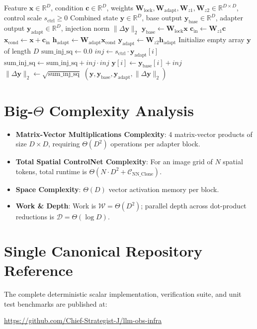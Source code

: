 \documentclass[11pt,a4paper]{article}
\theoremstyle{definition}
\begin{document}
\begin{algorithm}[H]
\caption{ControlNet Locked-Cloned Branch Forward Evaluation}
\begin{algorithmic}[1]
\Require Feature $\mathbf{x} \in \mathbb{R}^D$, condition $\mathbf{c} \in \mathbb{R}^D$, weights $\mathbf{W}_{\text{lock}}, \mathbf{W}_{\text{adapt}}, \mathbf{W}_{z1}, \mathbf{W}_{z2} \in \mathbb{R}^{D \times D}$, control scale $s_{\text{ctrl}} \ge 0$
\Ensure Combined state $\mathbf{y} \in \mathbb{R}^D$, base output $\mathbf{y}_{\text{base}} \in \mathbb{R}^D$, adapter output $\mathbf{y}_{\text{adapt}} \in \mathbb{R}^D$, injection norm $\|\Delta \mathbf{y}\|_2$
\State $\mathbf{y}_{\text{base}} \gets \mathbf{W}_{\text{lock}} \mathbf{x}$
\State $\mathbf{c}_{\text{in}} \gets \mathbf{W}_{z1} \mathbf{c}$
\State $\mathbf{x}_{\text{cond}} \gets \mathbf{x} + \mathbf{c}_{\text{in}}$
\State $\mathbf{h}_{\text{adapt}} \gets \mathbf{W}_{\text{adapt}} \mathbf{x}_{\text{cond}}$
\State $\mathbf{y}_{\text{adapt}} \gets \mathbf{W}_{z2} \mathbf{h}_{\text{adapt}}$
\State Initialize empty array $\mathbf{y}$ of length $D$
\State $\text{sum\_inj\_sq} \gets 0.0$
    \State $inj \gets s_{\text{ctrl}} \cdot \mathbf{y}_{\text{adapt}}[i]$
    \State $\text{sum\_inj\_sq} \gets \text{sum\_inj\_sq} + inj \cdot inj$
    \State $\mathbf{y}[i] \gets \mathbf{y}_{\text{base}}[i] + inj$
\EndFor
\State $\|\Delta \mathbf{y}\|_2 \gets \sqrt{\text{sum\_inj\_sq}}$
\State \Return $(\mathbf{y}, \mathbf{y}_{\text{base}}, \mathbf{y}_{\text{adapt}}, \|\Delta \mathbf{y}\|_2)$
\end{algorithmic}
\end{algorithm}

\section{Big-$\Theta$ Complexity Analysis}

\begin{itemize}
    \item \textbf{Matrix-Vector Multiplications Complexity}: 4 matrix-vector products of size $D \times D$, requiring $\Theta(D^2)$ operations per adapter block.
    \item \textbf{Total Spatial ControlNet Complexity}: For an image grid of $N$ spatial tokens, total runtime is $\Theta(N \cdot D^2 + \mathcal{C}_{\text{NN\_Clone}})$.
    \item \textbf{Space Complexity}: $\Theta(D)$ vector activation memory per block.
    \item \textbf{Work \& Depth}: Work is $\mathcal{W} = \Theta(D^2)$; parallel depth across dot-product reductions is $\mathcal{D} = \Theta(\log D)$.
\end{itemize}

\section{Single Canonical Repository Reference}

The complete deterministic scalar implementation, verification suite, and unit test benchmarks are published at:
\begin{center}
\url{https://github.com/Chief-Strategist-J/llm-obs-infra}
\end{center}
\end{document}
